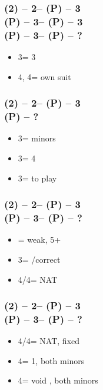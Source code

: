 \subsubsection*{(2\hearts) -- 2\nt -- (P) -- 3\clubs \\
                (P) -- 3\diams -- (P) -- 3\hearts \\
                (P) -- 3\spades -- (P) -- ?}
\begin{itemize}
    \item 3\nt = 3\spades
    \item 4\clubs, 4\diams = own suit
\end{itemize}

\subsubsection*{(2\hearts) -- 2\nt -- (P) -- 3\diams \\
                (P) -- ?}
\begin{itemize}
    \item 3\hearts = minors
    \item 3\spades = 4\spades
    \item 3\nt = to play
\end{itemize}

\subsubsection*{(2\hearts) -- 2\nt -- (P) -- 3\hearts \\
                (P) -- 3\spades -- (P) -- ?}
\begin{itemize}
    \item \pass = weak, 5+\spades
    \item 3\nt = \pass/correct
    \item 4\clubs/4\diams = NAT
\end{itemize}

\subsubsection*{(2\hearts) -- 2\nt -- (P) -- 3\spades \\
                (P) -- 3\nt -- (P) -- ?}
\begin{itemize}
    \item 4\clubs/4\diams = NAT, fixed
    \item 4\hearts = 1\spades, both minors
    \item 4\spades = void \spades, both minors
\end{itemize}

